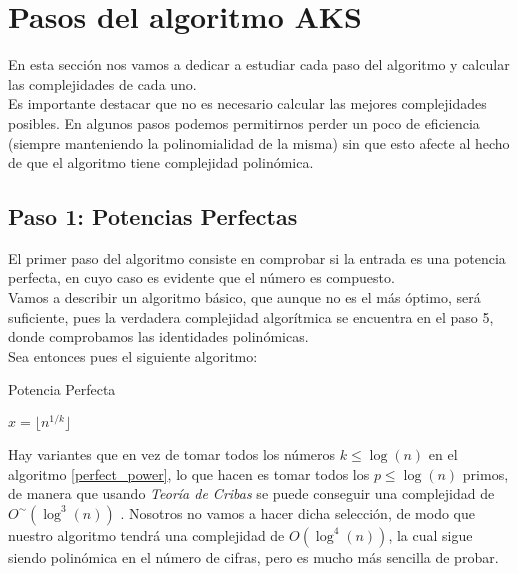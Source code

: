 \section{Pasos del algoritmo AKS}

En esta sección nos vamos a dedicar a estudiar cada paso del algoritmo y calcular las complejidades de cada uno.\\

Es importante destacar que no es necesario calcular las mejores complejidades posibles. En algunos pasos podemos permitirnos perder un poco de eficiencia (siempre manteniendo la polinomialidad de la misma) sin que esto afecte al hecho de que el algoritmo tiene complejidad polinómica.

\subsection{Paso 1: Potencias Perfectas}

El primer paso del algoritmo consiste en comprobar si la entrada es una potencia perfecta, en cuyo caso es evidente que el número es compuesto.\\

Vamos a describir un algoritmo básico, que aunque no es el más óptimo, será suficiente, pues la verdadera complejidad algorítmica se encuentra en el paso 5, donde comprobamos las identidades polinómicas.\\

Sea entonces pues el siguiente algoritmo:

\begin{algorithm}
	\caption{Potencia Perfecta}\label{perfect_power}
	\begin{algorithmic}[1]
				\State $x = \lfloor n^{1/k} \rfloor$
					\State {}
				\EndIf
			\EndFor
			\State {}
		\EndProcedure
	\end{algorithmic}
\end{algorithm}

Hay variantes que en vez de tomar todos los números $k \leq \log(n)$ en el algoritmo \ref{perfect_power}, lo que hacen es tomar todos los $p \leq \log(n)$ primos, de manera que usando \textit{Teoría de Cribas} se puede conseguir una complejidad de $O^\sim(\log^3(n))$ \cite{bach_sorenson_1989}. Nosotros no vamos a hacer dicha selección, de modo que nuestro algoritmo tendrá una complejidad de $O(\log^4(n))$, la cual sigue siendo polinómica en el número de cifras, pero es mucho más sencilla de probar.\\

